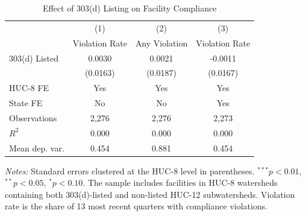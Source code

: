 \begin{table}[htbp]
\centering
\caption{Effect of 303(d) Listing on Facility Compliance}
\label{tab:main}
\begin{tabular}{lccc}
\hline\hline
 & (1) & (2) & (3) \\
 & Violation Rate & Any Violation & Violation Rate \\
\hline
303(d) Listed & 0.0030 & 0.0021 & -0.0011 \\
 & (0.0163) & (0.0187) & (0.0167) \\
\hline
HUC-8 FE & Yes & Yes & Yes \\
State FE & No & No & Yes \\
Observations & 2,276 & 2,276 & 2,273 \\
$R^2$ & 0.000 & 0.000 & 0.000 \\
Mean dep. var. & 0.454 & 0.881 & 0.454 \\
\hline\hline
\end{tabular}
\begin{tablenotes}[flushleft]\footnotesize
\item \textit{Notes:} Standard errors clustered at the HUC-8 level in parentheses.
$^{***}p<0.01$, $^{**}p<0.05$, $^{*}p<0.10$.
The sample includes facilities in HUC-8 watersheds containing both 303(d)-listed
and non-listed HUC-12 subwatersheds. Violation rate is the share of 13 most recent
quarters with compliance violations.
\end{tablenotes}
\end{table}
